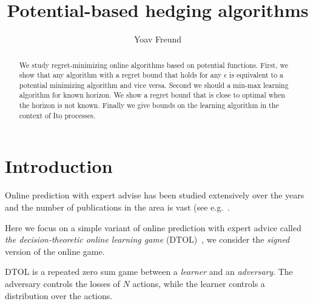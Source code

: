 \documentclass{article}[12pt]
\title{Potential-based hedging algorithms}
\author{Yoav Freund}
\begin{document}
\maketitle
\begin{abstract}
We study regret-minimizing online algorithms based on potential
functions. First, we show that any algorithm with a regret bound that
holds for any $\epsilon$ is equivalent to a potential minimizing
algorithm and vice versa. Second we should a min-max learning
algorithm for known horizon. We show a regret bound that is close to
optimal when the horizon is not known. Finally we give bounds on the
learning algorithm in the context of Ito processes.
\end{abstract}

\section{Introduction}

Online prediction with expert advise has been studied extensively over
the years and the number of publications in the area is vast (see
e.g.~\cite{vovk1990aggregating, feder1992universal,
  littlestone1994weighted, cesa1997use, cesa2006prediction}.

Here we focus on a simple variant of online prediction with expert
advice called {\em the decision-theoretic online learning game}
(DTOL)~\cite{freund1997decision}, we  consider the {\em
  signed} version of the online game.

DTOL is a repeated zero sum game between a {\em learner} and an {\em
  adversary}. The adversary controls the losses of $N$ actions, while
the learner controls a distribution over the actions.

\begin{figure}[ht!]
\end{figure}
\end{document}

